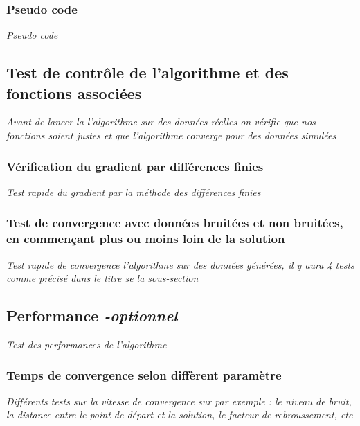 \documentclass{article}
\begin{document}
\subsubsection{Pseudo code}
\textit{Pseudo code}



\subsection{Test de contrôle de l'algorithme et des fonctions associées}
\textit{Avant de lancer la l'algorithme sur des données réelles on vérifie que nos fonctions soient justes et que l'algorithme converge pour des données simulées}

\subsubsection{Vérification du gradient par différences finies}
\textit{Test rapide du gradient par la méthode des différences finies}

\subsubsection{Test de convergence avec données bruitées et non bruitées, en commençant plus ou moins loin de la solution}
\textit{Test rapide de convergence l'algorithme sur des données générées, il y aura 4 tests comme précisé dans le titre se la sous-section}

\subsection{Performance \textit{-optionnel}}
\textit{Test des performances de l'algorithme}

\subsubsection{Temps de convergence selon diffèrent paramètre}
\textit{Différents tests sur la vitesse de convergence sur par exemple : le niveau de bruit, la distance entre le point de départ et la solution, le facteur de rebroussement, etc }
\end{document}
